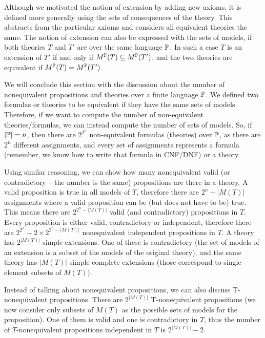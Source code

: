 Although we motivated the notion of extension by adding new axioms, it is defined more generally using the sets of consequences of the theory. This abstracts from the particular axioms and considers all equivalent theories the same. The notion of extension can also be expressed with the sets of models, if both theories $T$ and $T'$ are over the same language $\mathbb{P}$. In such a case $T$ is an extension of $T'$ if and only if $M^\mathbb{P}(T) \subseteq M^\mathbb{P}(T')$, and the two theories are equivalent if $M^\mathbb{P}(T)=M^\mathbb{P}(T')$.

We will conclude this section with the discussion about the number of nonequivalent propositions and theories over a finite language $\mathbb{P}$. We defined two formulas or theories to be equivalent if they have the same sets of models. Therefore, if we want to compute the number of non-equivalent theories/formulas, we can instead compute the number of sets of models. So, if $|\mathbb{P}| = n$, then there are $2^{2^n}$ non-equivalent formulas (theories) over $\mathbb{P}$, as there are $2^n$ different assignments, and every set of assignments represents a formula (remember, we know how to write that formula in CNF/DNF) or a theory. 

Using similar reasoning, we can show how many nonequivalent valid (or contradictory -- the number is the same) propositions are there in a theory. A valid proposition is true in all models of $T$, therefore there are $2^n-|M(T)|$ assignments where a valid proposition can be (but does not have to be) true. This means there are $2^{2^n-|M(T)|}$ valid (and contradictory) propositions in $T$. Every proposition is either valid, contradictory or independent, therefore there are $2^{2^n} - 2\times2^{2^n-|M(T)|}$ nonequivalent independent propositions in $T$. A theory has $2^{|M(T)|}$ simple extensions. One of these is contradictory (the set of models of an extension is a subset of the models of the original theory), and the same theory has $|M(T)|$ simple complete extensions (those correspond to single-element subsets of $M(T)$).

Instead of talking about nonequivalent propositions, we can also discuss T-nonequivalent propositions. There are $2^{|M(T)|}$ T-nonequivalent propositions (we now consider only subsets of $M(T)$ as the possible sets of models for the proposition). One of them is valid and one is contradictory in $T$, thus the number of $T$-nonequivalent propositions independent in $T$ is $2^{|M(T)|}-2$.

